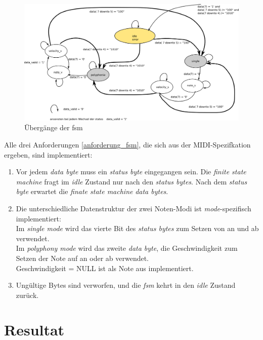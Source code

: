 \begin{figure}[H]
	\includegraphics[width=1\textwidth]{images/midi_control/fsm_detailliert.png}
	\caption{Übergänge der fsm}
	\label{fig.midi_fsm_detail}
\end{figure}

Alle drei Anforderungen \ref{anforderung_fsm}, die sich aus der MIDI-Spezifkation ergeben, sind implementiert:
\begin{enumerate}
	\item Vor jedem \textit{data byte} muss ein \textit{status byte} eingegangen sein. Die \textit{finite state machine} fragt im \textit{idle} Zustand nur nach den \textit{status bytes}. Nach dem \textit{status byte} erwartet die \textit{finate state machine} \textit{data bytes}. 
	\item Die unterschiedliche Datenstruktur der zwei Noten-Modi ist \textit{mode}-spezifisch implementiert:\\
Im \textit{single mode} wird das vierte Bit des \textit{status bytes} zum Setzen von an und ab verwendet.\\
Im \textit{polyphony mode} wird das zweite \textit{data byte}, die Geschwindigkeit zum Setzen der Note auf an oder ab verwendet. \\ Geschwindigkeit = NULL ist als Note aus implementiert.\\
	\item Ungültige Bytes sind verworfen, und die \textit{fsm } kehrt in den   \textit{idle} Zustand zurück.
\end{enumerate}


\newpage
\section{Resultat}\label{sect.midi_resultat}

